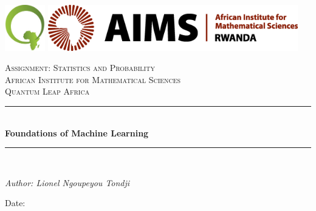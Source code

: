 \documentclass[12pt,twoside]{article}
\newcommand{\reporttitle}{Foundations of Machine Learning}
\newcommand{\reporttype}{Assignment: Statistics and Probability}
\begin{document}

\begin{titlepage}
\newcommand{\HRule}{\rule{\linewidth}{0.5mm}} %



\begin{center}
\includegraphics[height = 2cm]{qla}\hspace{4mm}
\includegraphics[height=2cm]{aims-rwanda}
\end{center}
 

\begin{center} %

\textsc{\LARGE \reporttype}\\[1.5cm] 
\textsc{\Large African Institute for Mathematical Sciences}\\[0.5cm] 
\textsc{\large Quantum Leap Africa}\\[0.5cm] 

\HRule \\[0.4cm]
{ \huge \bfseries \reporttitle}\\ %
\HRule \\[1.5cm]
\end{center}

\begin{minipage}{0.4\hsize}
 \begin{flushleft} \large
 \textit{Author: Lionel Ngoupeyou Tondji}\\
 \end{flushleft}
  \vspace{2cm}
 \makeatletter
 Date: \@date 
\end{minipage}
\vfill %



\makeatother

\end{titlepage}
\end{document}
